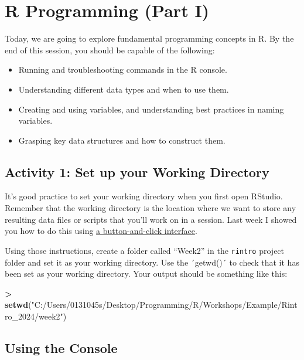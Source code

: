 \documentclass[
]{book}
\newenvironment{Shaded}{\begin{snugshade}}{\end{snugshade}}
\newcommand{\FunctionTok}[1]{\textcolor[rgb]{0.13,0.29,0.53}{\textbf{#1}}}
\newcommand{\NormalTok}[1]{#1}
\newcommand{\SpecialCharTok}[1]{\textcolor[rgb]{0.81,0.36,0.00}{\textbf{#1}}}
\newcommand{\StringTok}[1]{\textcolor[rgb]{0.31,0.60,0.02}{#1}}
\providecommand{\tightlist}{%
  \setlength{\itemsep}{0pt}\setlength{\parskip}{0pt}}
\begin{document}
\hypertarget{programming1}{%
\chapter{\texorpdfstring{\textbf{R Programming (Part I)}}{R Programming (Part I)}}\label{programming1}}

Today, we are going to explore fundamental programming concepts in R. By the end of this session, you should be capable of the following:

\begin{itemize}
\tightlist
\item
  Running and troubleshooting commands in the R console.
\item
  Understanding different data types and when to use them.
\item
  Creating and using variables, and understanding best practices in naming variables.
\item
  Grasping key data structures and how to construct them.
\end{itemize}

\hypertarget{activity-1-set-up-your-working-directory}{%
\section{Activity 1: Set up your Working Directory}\label{activity-1-set-up-your-working-directory}}

It's good practice to set your working directory when you first open RStudio. Remember that the working directory is the location where we want to store any resulting data files or scripts that you'll work on in a session. Last week I showed you how to do this using \protect\hyperlink{set_wd}{a button-and-click interface}.

Using those instructions, create a folder called ``Week2'' in the \texttt{rintro} project folder and set it as your working directory. Use the ´getwd()´ to check that it has been set as your working directory. Your output should be something like this:

\begin{Shaded}
\begin{Highlighting}[]
\SpecialCharTok{\textgreater{}} \FunctionTok{setwd}\NormalTok{(}\StringTok{"C:/Users/0131045s/Desktop/Programming/R/Workshops/Example/Rintro\_2024/week2"}\NormalTok{)}
\end{Highlighting}
\end{Shaded}

\hypertarget{using-the-console}{%
\section{Using the Console}\label{using-the-console}}
\end{document}
